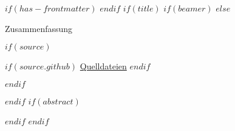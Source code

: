 $if(has-frontmatter)$
\frontmatter
$endif$
$if(title)$ %
$if(beamer)$ %
\frame{\titlepage}
$else$ %

\makeatletter
\begin{center}
  \vspace*{0.5cm}
  
  \textbf{\Huge \@title}
  
  \vspace{0.1cm}
  
  \textsf{\normalsize Zusammenfassung}
  
  \vspace{0.1cm}

  {\Large {\@author \hspace{4.8cm} \@date}}
  
  \vspace{0.5cm}

\end{center}
\makeatother

$if(source)$ %
\begin{center}
$if(source.github)$
{\large \faGithub\space \href{$source.github$}{Quelldateien}}
$endif$
\end{center}
$endif$ %


$endif$ %
$if(abstract)$
\begin{abstract}
$abstract$
\end{abstract}
$endif$
$endif$ %


\ifdefined\Shaded\renewenvironment{Shaded}{\begin{tcolorbox}[colback={shadecolor}, boxrule=0pt, frame hidden, enhanced, breakable]}{\end{tcolorbox}}\fi
